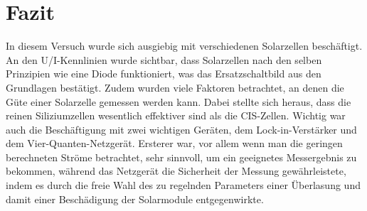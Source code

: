 

\chapter{Fazit}
\label{chap:fazit}


In diesem Versuch wurde sich ausgiebig mit verschiedenen Solarzellen beschäftigt. An den U/I-Kennlinien wurde sichtbar, dass Solarzellen nach den 
selben Prinzipien wie eine Diode funktioniert, was das Ersatzschaltbild aus den Grundlagen bestätigt. Zudem wurden viele Faktoren betrachtet, 
an denen die Güte einer Solarzelle gemessen werden kann. Dabei stellte sich heraus, dass die reinen Siliziumzellen wesentlich effektiver
sind als die CIS-Zellen. Wichtig war auch die Beschäftigung mit zwei wichtigen Geräten, dem Lock-in-Verstärker und dem 
Vier-Quanten-Netzgerät. Ersterer war, vor allem wenn man die geringen berechneten Ströme betrachtet, sehr sinnvoll, um ein geeignetes 
Messergebnis zu bekommen, während das Netzgerät die Sicherheit der Messung gewährleistete, indem es durch die freie Wahl des zu regelnden 
Parameters einer Überlasung und damit einer Beschädigung der Solarmodule entgegenwirkte.